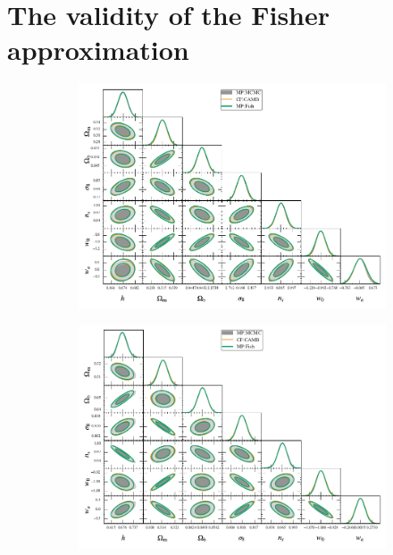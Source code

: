 \documentclass[oneside]{book}
\newcommand*{\cosmicfish}{\texttt{CF}\xspace}
\newcommand*{\camb}{{\tt CAMB}\xspace}
\newcommand*{\montefisher}{\texttt{MP:Fisher}\xspace}
\begin{document}
\section{The validity of the Fisher approximation}
\begin{figure}
    \centering
    \caption{Comparison of the one and two-dimensional marginalized contours obtained by MontePython in MCMC mode ({\tt MP:MCMC}) with the contours of \cosmicfish:\camb and \montefisher. The contours depict the 68\% and 95\% confidence intervals for the $w_0w_a$CDM model respectively. We plot only the cosmological parameters for the different probes. On the left, we show the spectroscopic probe and on the right, we show the photometric probe.}
    \begin{subfigure}[b]{0.49\textwidth}
        \centering
        \includegraphics[width=\textwidth]{S_w0wa_validation.pdf}
    \end{subfigure}
    \hfill
    \begin{subfigure}[b]{0.49\textwidth}
        \centering
        \includegraphics[width=\textwidth]{P_w0wa_validation.pdf}
    \end{subfigure}
       \label{fig:w0wa_triangle} 
\end{figure}
\end{document}
